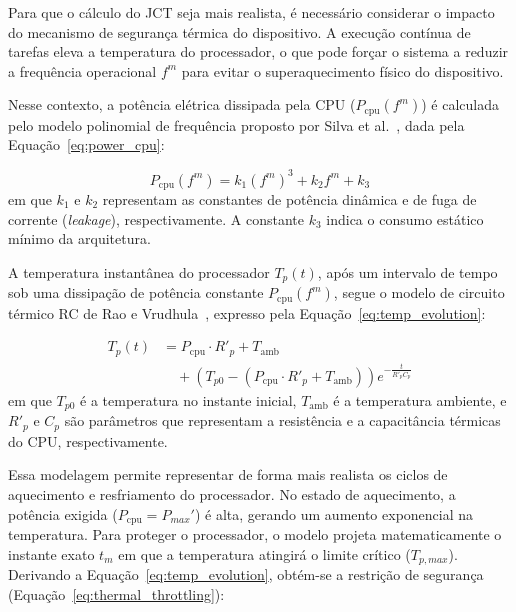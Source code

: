 Para que o cálculo do \gls{JCT} seja mais realista, é necessário considerar o impacto do mecanismo de segurança térmica do dispositivo. A execução contínua de tarefas eleva a temperatura do processador, o que pode forçar o sistema a reduzir a frequência operacional $f^m$ para evitar o superaquecimento físico do dispositivo.

Nesse contexto, a potência elétrica dissipada pela \gls{CPU} ($P_{\mathrm{cpu}}(f^m)$) é calculada pelo modelo polinomial de frequência proposto por Silva et al.~\cite{silva2022analytical}, dada pela Equação~\ref{eq:power_cpu}:

\begin{equation}
\label{eq:power_cpu}
P_{\mathrm{cpu}}(f^m) = k_1 (f^m)^3 + k_2 f^m + k_3
\end{equation}
em que $k_1$ e $k_2$ representam as constantes de potência dinâmica e de fuga de corrente (\textit{leakage}), respectivamente. A constante $k_3$ indica o consumo estático mínimo da arquitetura. 

A temperatura instantânea do processador $T_p(t)$, após um intervalo de tempo sob uma dissipação de potência constante $P_{\mathrm{cpu}}(f^m)$, segue o modelo de circuito térmico \gls{RC} de Rao e Vrudhula~\cite{rao2007performance}, expresso pela Equação~\ref{eq:temp_evolution}:

\begin{equation}
\label{eq:temp_evolution}
\begin{split}
T_p(t) &= P_{\mathrm{cpu}} \cdot R'_p + T_{\mathrm{amb}} \\
&\quad + (T_{p0} - (P_{\mathrm{cpu}} \cdot R'_p + T_{\mathrm{amb}})) e^{-\frac{t}{R'_p C_p}}
\end{split}
\end{equation}
em que $T_{p0}$ é a temperatura no instante inicial, $T_{\mathrm{amb}}$ é a temperatura ambiente, e $R'_p$ e $C_p$ são parâmetros que representam a resistência e a capacitância térmicas do \gls{CPU}, respectivamente.

Essa modelagem permite representar de forma mais realista os ciclos de aquecimento e resfriamento do processador. No estado de aquecimento, a potência exigida ($P_{\mathrm{cpu}} = P_{max}'$) é alta, gerando um aumento exponencial na temperatura. Para proteger o processador, o modelo projeta matematicamente o instante exato $t_m$ em que a temperatura atingirá o limite crítico ($T_{p,max}$). Derivando a Equação~\ref{eq:temp_evolution}, obtém-se a restrição de segurança (Equação~\ref{eq:thermal_throttling}):

